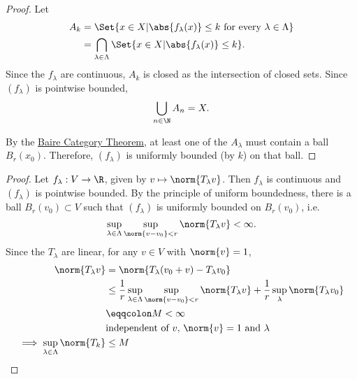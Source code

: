 \documentclass{article}
\begin{document}
\begin{proof}
    Let
    \begin{align*}
        A_k &= \Set{x \in X | \abs{f_\lambda(x)} \leq k \ \text{for every} \ \lambda \in \Lambda} \\
            &= \bigcap_{\lambda \in \Lambda} \Set{x \in X | \abs{f_\lambda(x)} \leq k}.
    \end{align*}
    Since the $f_\lambda$ are continuous, $A_k$ is closed as the intersection of closed sets.
    Since $(f_\lambda)$ is pointwise bounded,
    \begin{equation*}
        \bigcup_{n \in \N} A_n = X.
    \end{equation*}

    By the \hyperlink{thm:baireCategory}{Baire Category Theorem}, at least one of the $A_\lambda$ must contain a ball $B_r(x_0)$.
    Therefore, $(f_\lambda)$ is uniformly bounded (by $k$) on that ball.
\end{proof}


\begin{proof}
    Let $f_\lambda: V \to \R$, given by $v \mapsto \norm{T_\lambda v}$.
    Then $f_\lambda$ is continuous and $(f_\lambda)$ is pointwise bounded.
    By the principle of uniform boundedness, there is a ball $B_r(v_0) \subset V$ such that $(f_\lambda)$ is uniformly bounded on $B_r(v_0)$, i.e.
    \begin{equation*}
        \sup_{\lambda \in \Lambda} \sup_{\norm{v - v_0} < r} \norm{T_\lambda v} < \infty.
    \end{equation*}
    Since the $T_\lambda$ are linear, for any $v \in V$ with $\norm{v} = 1$,
    \begin{align*}
        \norm{T_\lambda v} &= \norm{T_\lambda(v_0 + v) - T_\lambda v_0} \\
                           &\leq \frac{1}{r} \sup_{\lambda \in \Lambda} \sup_{\norm{v - v_0} < r} \norm{T_\lambda v} + \frac{1}{r} \sup_{\lambda} \norm{T_\lambda v_0} \\
                           &\eqqcolon M < \infty \\
                           & \text{independent of $v$, $\norm{v} = 1$ and $\lambda$} \\
        \implies \sup_{\lambda \in \Lambda} \norm{T_k} &\leq M \qedhere
    \end{align*}
\end{proof}
\end{document}
